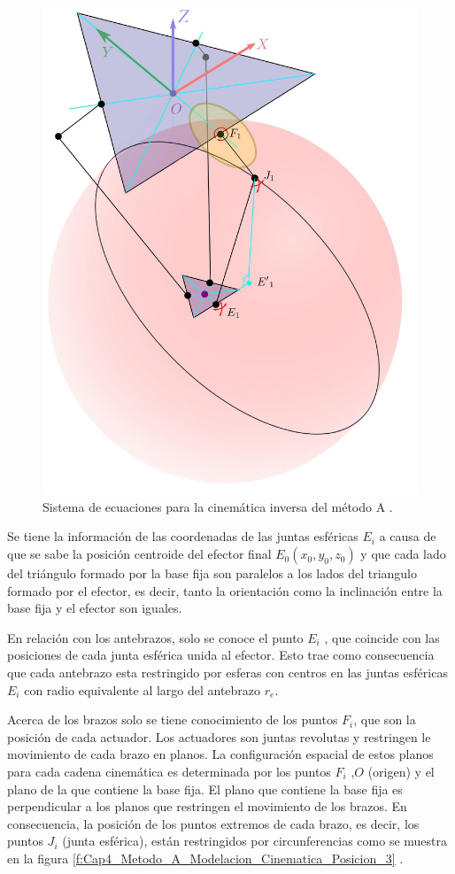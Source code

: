         
        \begin{figure}[htb]
             \centering
             \includegraphics[width=0.43\linewidth]{Main/Chapter4/Images4/DIBUJO6.jpg}
              \caption{Sistema de ecuaciones para la cinemática inversa del método A \cite{Diseno_e_implementacion_de_un_sistema_de_control_para_la_representacion_grafica_a_partir_de_imagenes}.}
              \label{f:Cap4_Metodo_A_Modelacion_Cinematica_Posicion_4}
        \end{figure}
        
         Se tiene la informaci\'{o}n de las coordenadas de las juntas esf\'{e}ricas $E_i$ a causa de que se sabe la posici\'{o}n centroide del efector final $E_0(x_0,y_0,z_0)$ y que cada lado del tri\'{a}ngulo formado por la base fija son paralelos a los lados del triangulo formado por el efector, es decir, tanto la orientaci\'{o}n como la inclinaci\'{o}n entre la base fija y el efector son iguales.  

        En relaci\'{o}n con los antebrazos, solo se conoce el punto $E_i$ , que coincide con las posiciones de cada junta esf\'{e}rica unida al efector. Esto trae como consecuencia que cada antebrazo esta restringido por esferas con centros en las juntas esf\'{e}ricas $E_i$ con radio equivalente al largo del antebrazo $r_e$.
    
        Acerca de los brazos solo se tiene conocimiento de los puntos $F_i$, que son la posici\'{o}n de cada actuador. Los actuadores son juntas revolutas y restringen le movimiento de cada brazo en planos. La configuraci\'{o}n espacial de estos planos para cada cadena cinem\'{a}tica es determinada por los puntos $F_i$ ,$O$ (origen) y el plano de la que contiene la base fija. El plano que contiene la base fija es perpendicular a los planos que restringen el movimiento de los brazos. En consecuencia, la posici\'{o}n de los puntos extremos de cada brazo, es decir, los puntos $J_i$ (junta esf\'{e}rica), est\'{a}n restringidos por circunferencias como se muestra en la figura \ref{f:Cap4_Metodo_A_Modelacion_Cinematica_Posicion_3} .


